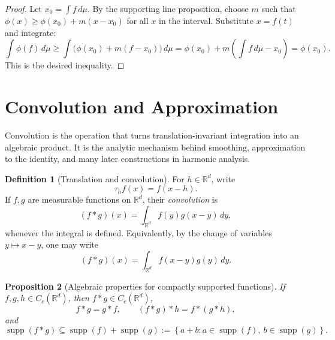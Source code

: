\documentclass[11pt,openany]{book}
\numberwithin{equation}{chapter}
\theoremstyle{definition}
\newtheorem{definition}{Definition}[chapter]
\theoremstyle{plain}
\newtheorem{proposition}[definition]{Proposition}
\theoremstyle{remark}
\newcommand{\R}{\mathbb{R}}
\newcommand{\1}{\mathbf{1}}
\newcommand{\dd}{\,d}
\newcommand{\set}[1]{\left\{#1\right\}}
\newcommand{\supp}{\operatorname{supp}}
\begin{document}
\begin{proof}
Let \(x_0=\int f\dd\mu\).  By the supporting line proposition, choose \(m\) such that \(\phi(x)\ge\phi(x_0)+m(x-x_0)\) for all \(x\) in the interval.  Substitute \(x=f(t)\) and integrate:
\[
    \int\phi(f)\dd\mu\ge \int\bigl(\phi(x_0)+m(f-x_0)\bigr)\dd\mu
    =\phi(x_0)+m\left(\int f\dd\mu-x_0\right)=\phi(x_0).
\]
This is the desired inequality.
\end{proof}


\section{Convolution and Approximation}\label{sec:euclidean-convolution}

Convolution is the operation that turns translation-invariant integration into an algebraic product.  It is the analytic mechanism behind smoothing, approximation to the identity, and many later constructions in harmonic analysis.

\begin{definition}[Translation and convolution]
For \(h\in\R^d\), write
\[
    \tau_h f(x)=f(x-h).
\]
If \(f,g\) are measurable functions on \(\R^d\), their \emph{convolution} is
\[
    (f*g)(x)=\int_{\R^d}f(y)g(x-y)\dd y,
\]
whenever the integral is defined.  Equivalently, by the change of variables \(y\mapsto x-y\), one may write
\[
    (f*g)(x)=\int_{\R^d}f(x-y)g(y)\dd y.
\]
\end{definition}

\begin{proposition}[Algebraic properties for compactly supported functions]
If \(f,g,h\in C_c(\R^d)\), then \(f*g\in C_c(\R^d)\),
\[
    f*g=g*f,
    \qquad
    (f*g)*h=f*(g*h),
\]
and
\[
    \supp(f*g)\subseteq \supp(f)+\supp(g)
    :=\set{a+b:a\in\supp(f),\ b\in\supp(g)}.
\]
\end{proposition}
\end{document}
